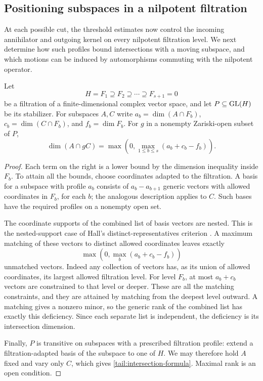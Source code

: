 \subsection{Positioning subspaces in a nilpotent filtration}

At each possible cut, the threshold estimates now control the
incoming annihilator and outgoing kernel on every nilpotent
filtration level. We next determine how such profiles bound
intersections with a moving subspace, and which motions can be
induced by automorphisms commuting with the nilpotent operator.

\begin{lemma}\label{lem:filtered-intersection}
Let
\[
 H=F_1\supseteq F_2\supseteq\cdots\supseteq F_{s+1}=0
\]
be a filtration of a finite-dimensional complex vector space, and
let \(P\subseteq\operatorname{GL}(H)\) be its stabilizer.  For subspaces \(A,C\)
write
\(a_b=\dim(A\cap F_b)\), \(c_b=\dim(C\cap F_b)\), and
\(f_b=\dim F_b\).  For \(g\) in a nonempty Zariski-open subset of \(P\),
\begin{equation}\label{tail:intersection-formula}
 \dim(A\cap gC)=
 \max\left(0,\max_{1\le b\le s}(a_b+c_b-f_b)\right).
\end{equation}
\end{lemma}

\begin{proof}
Each term on the right is a lower bound by the dimension inequality
inside \(F_b\).  To attain all the bounds, choose coordinates adapted
to the filtration.  A basis for a subspace with profile \(a_b\)
consists of \(a_b-a_{b+1}\) generic vectors with allowed coordinates
in \(F_b\), for each \(b\); the analogous description applies to
\(C\).  Such bases have the required profiles on a nonempty open set.

The coordinate supports of the combined list of basis vectors are
nested. This is the nested-support case of Hall's distinct-representatives
criterion \cite[Theorem~1]{Hall1935}. A maximum matching of these vectors to distinct allowed
coordinates leaves exactly
\[
 \max\left(0,\max_b(a_b+c_b-f_b)\right)
\]
unmatched vectors.  Indeed any collection of vectors has, as its
union of allowed coordinates, its largest allowed filtration level.
For level \(F_b\), at most \(a_b+c_b\) vectors are constrained to that
level or deeper.  These are all the matching constraints, and they
are attained by matching from the deepest level outward.  A matching
gives a nonzero minor, so the generic rank of the combined list has
exactly this deficiency.  Since each separate list is independent,
the deficiency is its intersection dimension.

Finally, \(P\) is transitive on subspaces with a prescribed filtration
profile: extend a filtration-adapted basis of the subspace to one of
\(H\).  We may therefore hold \(A\) fixed and vary only \(C\), which
gives \eqref{tail:intersection-formula}.  Maximal rank is an open
condition.
\end{proof}

